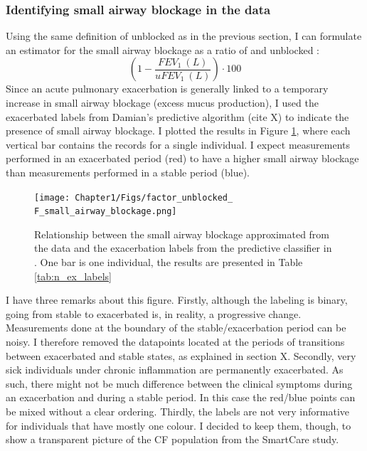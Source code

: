 \subsubsection{Identifying small airway blockage in the data}
Using the same definition of unblocked \F as in the previous section, I can formulate an estimator for the small airway blockage as a ratio of \F and unblocked \F:
\begin{equation}
    (1 - \frac{F\!EV_1\ (L)}{uF\!EV_1\ (L)})\cdot 100
\end{equation}
Since an acute pulmonary exacerbation is generally linked to a temporary increase in small airway blockage (excess mucus production), I used the exacerbated labels from Damian's predictive algorithm (cite X) to indicate the presence of small airway blockage. I plotted the results in Figure \ref{fig:factor_\F_small_airway_blockage}, where each vertical bar contains the \F records for a single individual. I expect measurements performed in an exacerbated period (red) to have a higher small airway blockage than measurements performed in a stable period (blue). 
\begin{figure}[!h]
    \caption{Relationship between the small airway blockage approximated from the data and the exacerbation labels from the predictive classifier in \cite{damian}.  One bar is one individual, the results are presented in Table \ref{tab:n_ex_labels}}
    \centering
    \texttt{[image: Chapter1/Figs/factor\_unblocked\_\\F\_small\_airway\_blockage.png]}
    \label{fig:factor_\F_small_airway_blockage}
\end{figure}
I have three remarks about this figure. Firstly, although the labeling is binary, going from stable to exacerbated is, in reality, a progressive change. Measurements done at the boundary of the stable/exacerbation period can be noisy. I therefore removed the datapoints located at the periods of transitions between exacerbated and stable states, as explained in section X. Secondly, very sick individuals under chronic inflammation are permanently exacerbated. As such, there might not be much difference between the clinical symptoms during an exacerbation and during a stable period. In this case the red/blue points can be mixed without a clear ordering. Thirdly, the labels are not very informative for individuals that have mostly one colour. I decided to keep them, though, to show a transparent picture of the CF population from the SmartCare study.

